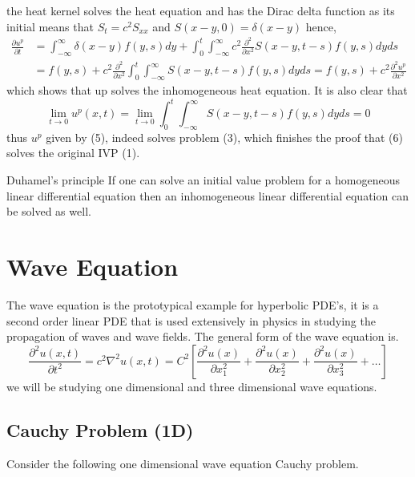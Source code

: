 \documentclass[]{article}
\begin{document}
the heat kernel solves the heat equation and has the Dirac delta function as its initial
means that $S_t =c^2 S_{xx}$ and $S(x-y,0) = \delta(x-y)$ hence,
\begin{align*}
    \frac{\partial u^p}{\partial t} &= \int_{-\infty}^{\infty}\delta(x-y) f(y,s) dy  + \int_{0}^{t}\int_{-\infty}^{\infty}c^2 \frac{\partial^2}{\partial x^2}S(x-y,t-s) f(y,s)dyds
    \\
    &= f(y,s) + c^2 \frac{\partial^2}{\partial x^2} \int_{0}^{t}\int_{-\infty}^{\infty}S(x-y,t-s) f(y,s)dyds
    = f(y,s) + c^2 \frac{\partial^2 u^p}{\partial x^2}
\end{align*}
which shows that up solves the inhomogeneous heat equation. It is also clear that
\[
\lim_{t \to 0} u^p(x,t)  = \lim_{t \to 0}\int_{0}^{t} \int_{-\infty}^{\infty}S(x-y,t-s) f(y,s)dyds = 0
\]
thus $u^p$ given by (5), indeed solves problem (3), which finishes the proof that (6) solves the original IVP (1).
\begin{enrichment*}{Duhamel's principle}
    If one can solve an initial value problem for a homogeneous linear differential equation then an inhomogeneous linear differential equation can be solved as well.
\end{enrichment*}
\setcounter{equation}{0}
\section{Wave Equation}
The wave equation is the prototypical example for hyperbolic PDE's, it is a second order linear PDE that is used extensively in physics in studying the propagation of waves and wave fields. The general form of the wave equation is.
\[
\frac{\partial^2 u(x,t)}{\partial t^2} = c^2\nabla^2 u(x,t) = C^2\left[\frac{\partial^2 u(x)}{\partial x^{2}_{1}} + \frac{\partial^2 u(x)}{\partial x^{2}_{2}} + \frac{\partial^2 u(x)}{\partial x^{2}_{3}} + \dots\right]    
\]
we will be studying one dimensional and three dimensional wave equations.
\setcounter{equation}{0}
\subsection{Cauchy Problem (1D)}
Consider the following one dimensional wave equation Cauchy problem.
\end{document}
